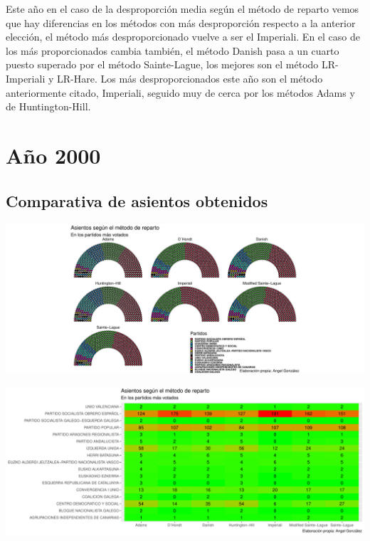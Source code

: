\documentclass[12pt,a4paper,]{book}
\numberwithin{dummy}{section}
\theoremstyle{ocrenumbox}
\theoremstyle{blacknumex}
\theoremstyle{blacknumbox}
\theoremstyle{ocrenum}
\theoremstyle{ocrenum}
\begin{document}
Este año en el caso de la desproporción media según el método de reparto
vemos que hay diferencias en los métodos con más desproporción respecto
a la anterior elección, el método más desproporcionado vuelve a ser el
Imperiali. En el caso de los más proporcionados cambia también, el
método Danish pasa a un cuarto puesto superado por el método
Sainte-Lague, los mejores son el método LR-Imperiali y LR-Hare. Los más
desproporcionados este año son el método anteriormente citado,
Imperiali, seguido muy de cerca por los métodos Adams y de
Huntington-Hill.

\hypertarget{auxf1o-2000}{%
\section{Año 2000}\label{auxf1o-2000}}

\hypertarget{comparativa-de-asientos-obtenidos-7}{%
\subsection{Comparativa de asientos
obtenidos}\label{comparativa-de-asientos-obtenidos-7}}

\begin{center}\includegraphics[width=1\linewidth]{figurasR/unnamed-chunk-97-1} \end{center}

\begin{center}\includegraphics[width=1\linewidth]{figurasR/unnamed-chunk-97-2} \end{center}
\end{document}
